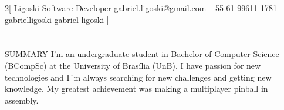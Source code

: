 \documentclass{my_cv}
\begin{document}
\begin{multicols}{2}[
        {Ligoski}%
        {Software Developer}%
        {\href{mailto:gabriel.ligoski@gmail.com}{gabriel.ligoski@gmail.com}}%
        {+55 61 99611-1781}%
        {\href{https://github.com/gabrielligoski}{gabrielligoski} }%
        {\href{https://www.linkedin.com/in/gabriel-ligoski/}{gabriel-ligoski} }%
]
\end{multicols}
\vspace{15mm}
\section{\faFileText}{SUMMARY}
I'm an undergraduate student in Bachelor of Computer Science (BCompSc) at the University of Brasília (UnB). I have passion for new technologies and I´m always searching for new challenges and getting new knowledge.
My greatest achievement was making a multiplayer pinball in assembly.

\vspace{5mm}
\end{document}
